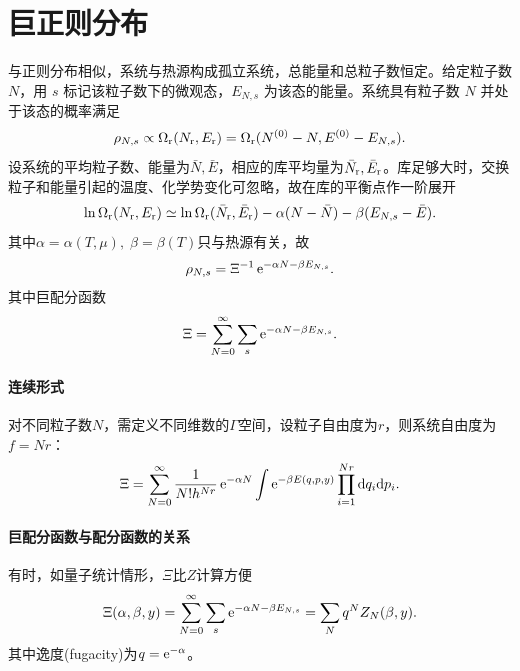 \section{巨正则分布}

与正则分布相似，系统与热源构成孤立系统，总能量和总粒子数恒定。给定粒子数 $N$，用 $s$ 标记该粒子数下的微观态，$E_{N,s}$ 为该态的能量。系统具有粒子数 $N$ 并处于该态的概率满足
\[
	\rho_{N,s} \propto \Omega_\mathrm r(N_\mathrm r,E_\mathrm r) = \Omega_\mathrm r(N^{(0)} - N,E^{(0)} - E_{N,s}).
\]
设系统的平均粒子数、能量为$\bar N,\bar E$，相应的库平均量为$\bar N_\mathrm r,\bar E_\mathrm r$。库足够大时，交换粒子和能量引起的温度、化学势变化可忽略，故在库的平衡点作一阶展开
\[
	\ln\Omega_\mathrm r(N_\mathrm r,E_\mathrm r) \simeq \ln\Omega_\mathrm r(\bar N_\mathrm r,\bar E_\mathrm r)
	- \alpha(N - \bar N) - \beta(E_{N,s} - \bar E).
\]
其中$\alpha = \alpha(T,\mu),\;\beta = \beta(T)$只与热源有关，故
\begin{align}
	\rho_{N,s} = \Xi^{-1}\mathop{}\!\mathrm{e}^{-\alpha N-\beta E_{N,s}}.
\end{align}
其中巨配分函数
\begin{align}
	\Xi = \sum_{N=0}^\infty\sum_s\mathop{}\!\mathrm{e}^{-\alpha N-\beta E_{N,s}}.
\end{align}
\paragraph{连续形式}对不同粒子数$N$，需定义不同维数的$\varGamma$空间，设粒子自由度为$r$，则系统自由度为$f = Nr$：
\begin{align}
	\Xi = \sum_{N=0}^\infty\frac1{N!h^{Nr}}\mathop{}\!\mathrm{e}^{-\alpha N}\int\mathop{}\!\mathrm{e}^{-\beta E(q,p,y)}\prod_{i=1}^{Nr}\mathop{}\!\mathrm{d} q_i\mathrm{d} p_i.
\end{align}
\paragraph{巨配分函数与配分函数的关系}有时，如量子统计情形，$\Xi$比$Z$计算方便
\[
	\Xi(\alpha,\beta,y) = \sum_{N=0}^\infty\sum_s\mathop{}\!\mathrm{e}^{-\alpha N-\beta E_{N,s}} = \sum_Nq^NZ_N(\beta,y).
\]
其中逸度(fugacity)为$q = \mathop{}\!\mathrm{e}^{-\alpha}$。

